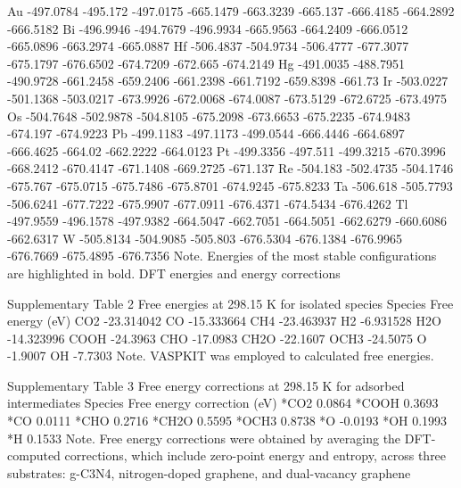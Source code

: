 Au	-497.0784	-495.172	-497.0175	-665.1479	-663.3239	-665.137	-666.4185	-664.2892	-666.5182
Bi	-496.9946	-494.7679	-496.9934	-665.9563	-664.2409	-666.0512	-665.0896	-663.2974	-665.0887
Hf	-506.4837	-504.9734	-506.4777	-677.3077	-675.1797	-676.6502	-674.7209	-672.665	-674.2149
Hg	-491.0035	-488.7951	-490.9728	-661.2458	-659.2406	-661.2398	-661.7192	-659.8398	-661.73
Ir	-503.0227	-501.1368	-503.0217	-673.9926	-672.0068	-674.0087	-673.5129	-672.6725	-673.4975
Os	-504.7648	-502.9878	-504.8105	-675.2098	-673.6653	-675.2235	-674.9483	-674.197	-674.9223
Pb	-499.1183	-497.1173	-499.0544	-666.4446	-664.6897	-666.4625	-664.02	-662.2222	-664.0123
Pt	-499.3356	-497.511	-499.3215	-670.3996	-668.2412	-670.4147	-671.1408	-669.2725	-671.137
Re	-504.183	-502.4735	-504.1746	-675.767	-675.0715	-675.7486	-675.8701	-674.9245	-675.8233
Ta	-506.618	-505.7793	-506.6241	-677.7222	-675.9907	-677.0911	-676.4371	-674.5434	-676.4262
Tl	-497.9559	-496.1578	-497.9382	-664.5047	-662.7051	-664.5051	-662.6279	-660.6086	-662.6317
W	-505.8134	-504.9085	-505.803	-676.5304	-676.1384	-676.9965	-676.7669	-675.4895	-676.7356
Note. Energies of the most stable configurations are highlighted in bold.
DFT energies and energy corrections

Supplementary Table 2
Free energies at 298.15 K for isolated species
Species	Free energy (eV)
CO2	-23.314042
CO	-15.333664
CH4	-23.463937
H2	-6.931528
H2O	-14.323996
COOH	-24.3963
CHO	-17.0983
CH2O	-22.1607
OCH3	-24.5075
O	-1.9007
OH	-7.7303
Note. VASPKIT \cite{wang2021vaspkit} was employed to calculated free energies.


Supplementary Table 3
Free energy corrections at 298.15 K for adsorbed intermediates
Species	Free energy correction (eV)
*CO2	0.0864
*COOH	0.3693
*CO	0.0111
*CHO	0.2716
*CH2O	0.5595
*OCH3	0.8738
*O	-0.0193
*OH	0.1993
*H	0.1533
Note. Free energy corrections were obtained by averaging the DFT-computed corrections, which include zero-point energy and entropy, across three substrates: g-C3N4, nitrogen-doped graphene, and dual-vacancy graphene


